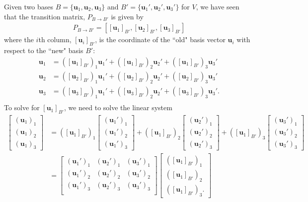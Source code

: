 \documentclass[12pt,letterpaper,reqno]{article}
\numberwithin{equation}{section}
\newcommand{\bu}{\mathbf{u}}
\begin{document}
Given two bases $B=\{\bu_1,\bu_2,\bu_3\}$ and $B'=\{\bu_1',\bu_2',\bu_3'\}$ for $V$, we have seen that the transition matrix, $P_{B \to B'}$ is given by 
\begin{align*}
	P_{B \to B'}=\left[[\bu_1]_{B'},[\bu_2]_{B'},[\bu_3]_{B'}\right]
\end{align*}
where the $i$th column, $[\bu_i]_{B'}$, is the coordinate of the ``old" basis vector $\bu_i$ with respect to the ``new" basis $B'$:
\begin{align*}
	\bu_1&=([\bu_1]_{B'})_1\bu_1'+([\bu_1]_{B'})_2\bu_2'+([\bu_1]_{B'})_3\bu_3' \\
	\bu_2&=([\bu_2]_{B'})_1\bu_1'+([\bu_2]_{B'})_2\bu_2'+([\bu_2]_{B'})_3\bu_3' \\
	\bu_3&=([\bu_3]_{B'})_1\bu_1'+([\bu_3]_{B'})_2\bu_2'+([\bu_3]_{B'})_3\bu_3'. \\
\end{align*}
To solve for $[\bu_1]_{B'}$, we need to solve the linear system
\begin{align*}
	\begin{bmatrix}
		(\bu_1)_1 \\ (\bu_1)_2 \\ (\bu_1)_3
	\end{bmatrix}&=([\bu_1]_{B'})_1\begin{bmatrix}
		 (\bu_1')_1 \\ (\bu_1')_2 \\ (\bu_1')_3
	\end{bmatrix} +([\bu_1]_{B'})_2\begin{bmatrix}
		 (\bu_2')_1 \\ (\bu_2')_2 \\ (\bu_2')_3
	\end{bmatrix}+([\bu_1]_{B'})_3\begin{bmatrix}
		 (\bu_3')_1 \\ (\bu_3')_2 \\ (\bu_3')_3
	\end{bmatrix}\\
	&=\begin{bmatrix}
		(\bu_1')_1 & (\bu_2')_1 & (\bu_3')_1 \\
		(\bu_1')_2 & (\bu_2')_2 & (\bu_3')_2 \\
		(\bu_1')_3 & (\bu_2')_3 & (\bu_3')_3 \\
	\end{bmatrix}\begin{bmatrix}
		([\bu_1]_{B'})_1 \\ ([\bu_1]_{B'})_2 \\ ([\bu_1]_{B'})_3.
	\end{bmatrix}
\end{align*}
\end{document}
